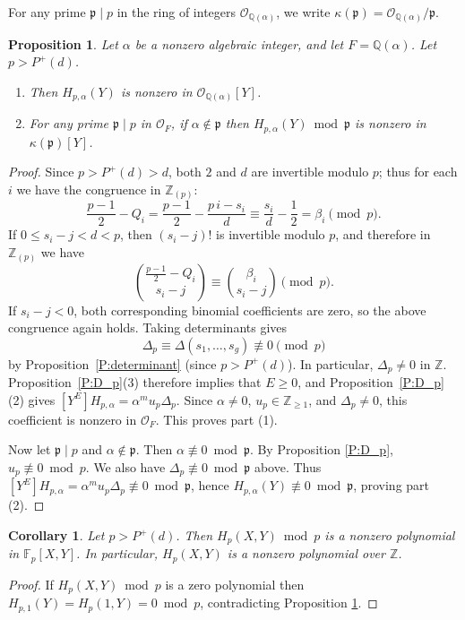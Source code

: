 \documentclass{amsart}
\theoremstyle{plain}
\newtheorem{proposition}[theorem]{Proposition}
\newtheorem{corollary}[theorem]{Corollary}
\theoremstyle{remark}
\theoremstyle{remark}
\newcommand{\fp}{\mathfrak{p}}
\newcommand{\cO}{\mathcal{O}}
\newcommand{\0}{\mathbf{0}}
\newcommand{\1}{\mathbf{1}}
\newcommand{\F}{\mathbb{F}}
\newcommand{\Q}{\mathbb{Q}}
\newcommand{\Z}{\mathbb{Z}}
\begin{document}
For any prime $\fp\mid p$ in the ring of integers $\cO_{\Q(\alpha)}$, 
we write $\kappa(\fp)=\cO_{\Q(\alpha)}/\fp$.

\begin{proposition}
\label{P:nonzero}
Let $\alpha$ be a nonzero algebraic integer, and let $F=\Q(\alpha)$.
Let $p>P^+(d)$.
\begin{enumerate}
\item Then $H_{p,\alpha}(Y)$ is nonzero in $\cO_{\Q(\alpha)}[Y]$.
\item For any prime $\fp\mid p$ in $\cO_F$, if 
$\alpha\not\in\fp$ then $H_{p,\alpha}(Y) \bmod \fp$
is nonzero in $\kappa(\fp)[Y]$.
\end{enumerate}
\end{proposition}

\begin{proof}
Since \(p>P^+(d)>d\), both
\(2\) and \(d\) are invertible modulo \(p\); thus for each $i$ we have 
the congruence in $\Z_{(p)}$:
\[
\frac{p-1}{2}-Q_i
=\frac{p-1}{2}-\frac{p\,i-s_i}{d}
\equiv \frac{s_i}{d}-\frac12
=\beta_i
\pmod p.
\]
If \(0\le s_i-j<d<p\), then \((s_i-j)!\) is invertible modulo \(p\),
and therefore in $\Z_{(p)}$ we have
\[
\binom{\frac{p-1}{2}-Q_i}{s_i-j}
\equiv
\binom{\beta_i}{s_i-j}
\pmod p.
\]
If \(s_i-j<0\), both corresponding binomial coefficients are zero, so the above congruence again holds.
Taking determinants gives
\[
\Delta_p\equiv
\Delta(s_1,\ldots,s_g)\not\equiv0\pmod p
\]
by Proposition~\ref{P:determinant} (since $p>P^+(d)$). 
In particular, $\Delta_p\ne 0$ in $\Z$.
Proposition~\ref{P:D_p}(3) therefore implies that $E\ge 0$, and 
Proposition~\ref{P:D_p}(2) gives 
$[Y^E]H_{p,\alpha}=\alpha^m u_p\Delta_p.$
Since $\alpha\ne 0$, $u_p\in\Z_{\ge 1}$, and $\Delta_p\ne 0$, 
this coefficient is nonzero in $\cO_F$. This proves part (1).

Now let $\fp\mid p$ and $\alpha\not\in \fp$. 
Then $\alpha\not\equiv 0\bmod \fp$.
By Proposition \ref{P:D_p}, $u_p\not\equiv 0\bmod p$.
We also have $\Delta_p\not\equiv 0\bmod \fp$ above.
Thus $[Y^E]H_{p,\alpha}= \alpha^m u_p \Delta_p\not\equiv 0\bmod \fp$, hence 
$H_{p,\alpha}(Y)\not\equiv 0\bmod \fp$, proving part (2).
\end{proof}


\begin{corollary}\label{C:nonzero}
Let $p>P^+(d)$.  
Then 
$
H_p(X,Y) \bmod p
$
is a nonzero polynomial in $\F_p[X,Y]$. 
In particular, $H_p(X,Y)$ is a nonzero polynomial over $\Z$.
\end{corollary}
\begin{proof}
If $H_p(X,Y)\bmod p$ is a zero polynomial then 
$H_{p,1}(Y)=H_p(1,Y)=0\bmod p$, 
contradicting Proposition \ref{P:nonzero}.
\end{proof}
\end{document}
